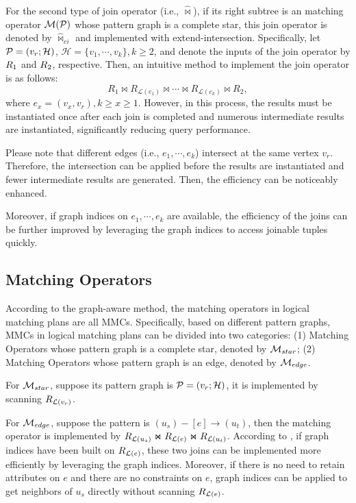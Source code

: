 For the second type of join operator (i.e., $\widehat{\Join}$), if its right subtree is an matching operator $\mathcal{M}(\mathcal{P})$ whose pattern graph is a complete star, this join operator is denoted by $\widehat{\Join}_{ei}$ and implemented with extend-intersection.
Specifically, let \(\mathcal{P} = (v_r; \mathcal{H})\), $\mathcal{H} = \{v_1, \cdots, v_k\}, k \geq 2$, and denote the inputs of the join operator by ${R_{1}}$ and ${R_{2}}$, respective.
Then, an intuitive method to implement the join operator is as follows:
\begin{equation*}
    R_{1} \Join R_{\mathcal{L}(e_1)} \Join \cdots \Join R_{\mathcal{L}(e_k)} \Join R_{2},
\end{equation*}
where $e_x = (v_x, v_r), k \geq x \geq 1$.
However, in this process, the results must be instantiated once after each join is completed and numerous intermediate results are instantiated, significantly reducing query performance.

Please note that different edges (i.e., $e_1, \cdots, e_k$) intersect at the same vertex $v_r$.
Therefore, the intersection can be applied before the results are instantiated and fewer intermediate results are generated.
Then, the efficiency can be noticeably enhanced.

Moreover, if graph indices on $e_1, \cdots, e_k$ are available, the efficiency of the joins can be further improved by leveraging the graph indices to access joinable tuples quickly.


\subsection{Matching Operators}
\label{sec:matching-operator}
According to the graph-aware method, the matching operators in logical matching plans are all MMCs.
Specifically, based on different pattern graphs, MMCs in logical matching plans can be divided into two categories: 
(1) Matching Operators whose pattern graph is a complete star, denoted by $\mathcal{M}_{star}$;
(2) Matching Operators whose pattern graph is an edge, denoted by $\mathcal{M}_{edge}$.

For $\mathcal{M}_{star}$, suppose its pattern graph is $\mathcal{P} = (v_r; \mathcal{H})$, it is implemented by scanning ${R_{\mathcal{L}(v_r)}}$.

For $\mathcal{M}_{edge}$, suppose the pattern is $(u_s) - [e] \rightarrow (u_t)$, then the matching operator is implemented by ${R_{\mathcal{L}(u_s)}} \Join {\ensuremath R_{\mathcal{L}(e)}} \Join {\ensuremath R_{\mathcal{L}(u_t)}}$.
According to , if graph indices have been built on ${R_{\mathcal{L}(e)}}$, these two joins can be implemented more efficiently by leveraging the graph indices.
Moreover, if there is no need to retain attributes on $e$ and there are no constraints on $e$, graph indices can be applied to get neighbors of $u_s$ directly without scanning ${R_{\mathcal{L}(e)}}$.

